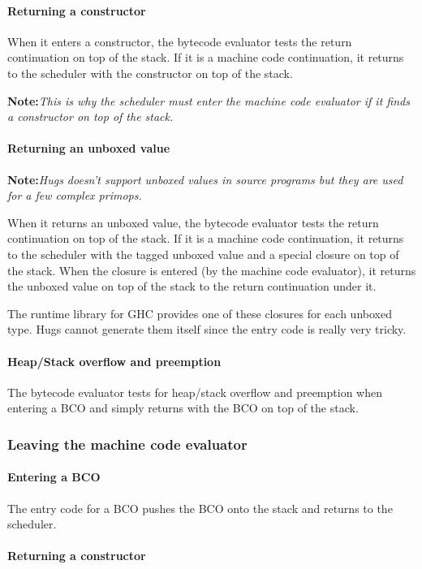 \documentclass[11pt]{article}
\newcommand{\note}[1]{{{\bf Note:}\sl #1}}
\newcommand{\Subsubsection}[2]{\subsubsection{#1}\label{sec:#2}}
\begin{document}
\paragraph{Returning a constructor}

When it enters a constructor, the bytecode evaluator tests the return
continuation on top of the stack.  If it is a machine code
continuation, it returns to the scheduler with the constructor on top
of the stack.

\note{This is why the scheduler must enter the machine code evaluator
if it finds a constructor on top of the stack.}

\paragraph{Returning an unboxed value}

\note{Hugs doesn't support unboxed values in source programs but they
are used for a few complex primops.}

When it returns an unboxed value, the bytecode evaluator tests the
return continuation on top of the stack.  If it is a machine code
continuation, it returns to the scheduler with the tagged unboxed
value and a special closure on top of the stack.  When the closure is
entered (by the machine code evaluator), it returns the unboxed value
on top of the stack to the return continuation under it.

The runtime library for GHC provides one of these closures for each unboxed
type.  Hugs cannot generate them itself since the entry code is really
very tricky.

\paragraph{Heap/Stack overflow and preemption}

The bytecode evaluator tests for heap/stack overflow and preemption
when entering a BCO and simply returns with the BCO on top of the
stack.

\Subsubsection{Leaving the machine code evaluator}{ghc-to-hugs-switch}

\paragraph{Entering a BCO}

The entry code for a BCO pushes the BCO onto the stack and returns to
the scheduler.

\paragraph{Returning a constructor}
\end{document}
